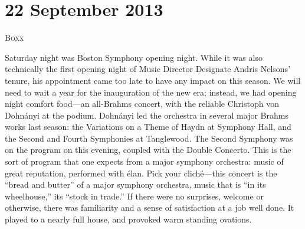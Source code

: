 \chapter{22 September 2013}

\textsc{Boxx}

Saturday night was Boston Symphony opening night. While it was also technically the first opening night of Music Director Designate Andris Nelsons’ tenure, his appointment came too late to have any impact on this season. We will need to wait a year for the inauguration of the new era; instead, we had opening night comfort food—an all-Brahms concert, with the reliable Christoph von Dohnányi at the podium. Dohnányi led the orchestra in several major Brahms works last season: the Variations on a Theme of Haydn at Symphony Hall, and the Second and Fourth Symphonies at Tanglewood. The Second Symphony was on the program on this evening, coupled with the Double Concerto. This is the sort of program that one expects from a major symphony orchestra: music of great reputation, performed with élan. Pick your cliché—this concert is the “bread and butter” of a major symphony orchestra, music that is “in its wheelhouse,” its “stock in trade.” If there were no surprises, welcome or otherwise, there was familiarity and a sense of satisfaction at a job well done. It played to a nearly full house, and provoked warm standing ovations.

